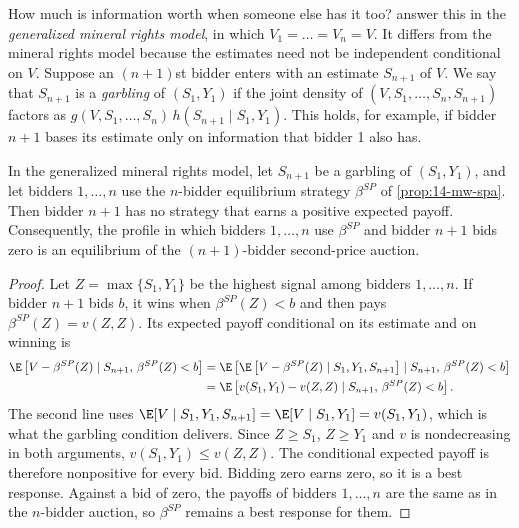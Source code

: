 How much is information worth when someone else has it too? \citet[p.~1101]{MilgromWeber1982} answer this
in the \emph{generalized mineral rights model}, in which $V_1=\dots=V_n=V$. It differs from the mineral rights
model because the estimates need not be independent conditional on $V$. Suppose an $(n+1)$st bidder enters
with an estimate $S_{n+1}$ of $V$. We say that $S_{n+1}$ is a \emph{garbling} of $(S_1,Y_1)$ if the joint
density of $(V,S_1,\dots,S_n,S_{n+1})$ factors as $g(V,S_1,\dots,S_n)\,h(S_{n+1}\mid S_1,Y_1)$. This holds,
for example, if bidder $n+1$ bases its estimate only on information that bidder 1 also has.

\begin{proposition}\label{prop:14-mw-garbling}
In the generalized mineral rights model, let $S_{n+1}$ be a garbling of $(S_1,Y_1)$, and let bidders
$1,\dots,n$ use the $n$-bidder equilibrium strategy $\beta^{SP}$ of \cref{prop:14-mw-spa}. Then bidder $n+1$
has no strategy that earns a positive expected payoff. Consequently, the profile in which bidders
$1,\dots,n$ use $\beta^{SP}$ and bidder $n+1$ bids zero is an equilibrium of the $(n+1)$-bidder
second-price auction.
\end{proposition}

\begin{proof}
Let $Z=\max\{S_1,Y_1\}$ be the highest signal among bidders $1,\dots,n$. If bidder $n+1$ bids $b$, it wins
when $\beta^{SP}(Z)<b$ and then pays $\beta^{SP}(Z)=v(Z,Z)$. Its expected payoff conditional on its
estimate and on winning is
\begin{align*}
  \E\left[V-\beta^{SP}(Z)\mid S_{n+1},\,\beta^{SP}(Z)<b\right]
  &=\E\left[\E\left[V-\beta^{SP}(Z)\mid S_1,Y_1,S_{n+1}\right]\mid S_{n+1},\,\beta^{SP}(Z)<b\right]\\
  &=\E\left[v(S_1,Y_1)-v(Z,Z)\mid S_{n+1},\,\beta^{SP}(Z)<b\right].
\end{align*}
The second line uses $\E[V\mid S_1,Y_1,S_{n+1}]=\E[V\mid S_1,Y_1]=v(S_1,Y_1)$, which is what the garbling
condition delivers. Since $Z\ge S_1$, $Z\ge Y_1$ and $v$ is nondecreasing in both arguments,
$v(S_1,Y_1)\le v(Z,Z)$. The conditional expected payoff is therefore nonpositive for every bid. Bidding zero
earns zero, so it is a best response. Against a bid of zero, the payoffs of bidders $1,\dots,n$ are the same
as in the $n$-bidder auction, so $\beta^{SP}$ remains a best response for them.
\end{proof}

